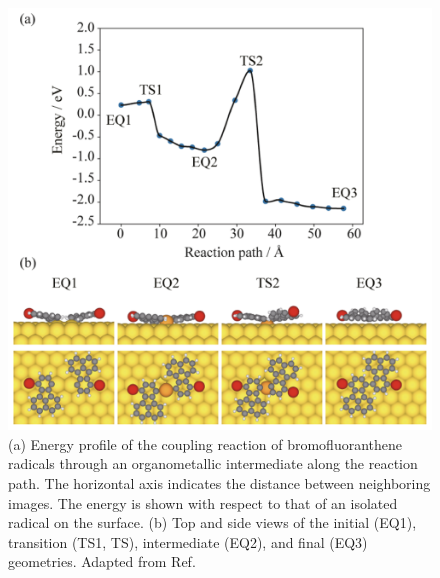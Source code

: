 \documentclass[%
 reprint,
 amsmath,amssymb,
 aps,
prb,
floatfix,
]{revtex4-2}
\begin{document}

\begin{figure}[tb]
\centering
\includegraphics[width=0.75\columnwidth]{Fig/adatominformation.png}
\caption{(a) Energy profile of the coupling reaction of bromofluoranthene radicals through an organometallic intermediate along the reaction path. The horizontal axis indicates the distance between neighboring images. The energy is shown with respect to that of an isolated radical on the surface. (b) Top and side views of the initial (EQ1), transition (TS1, TS), intermediate (EQ2), and final (EQ3) geometries. Adapted from Ref.~\cite{jpcc2018}}
\label{fig:high-lift}
\end{figure}
\end{document}
